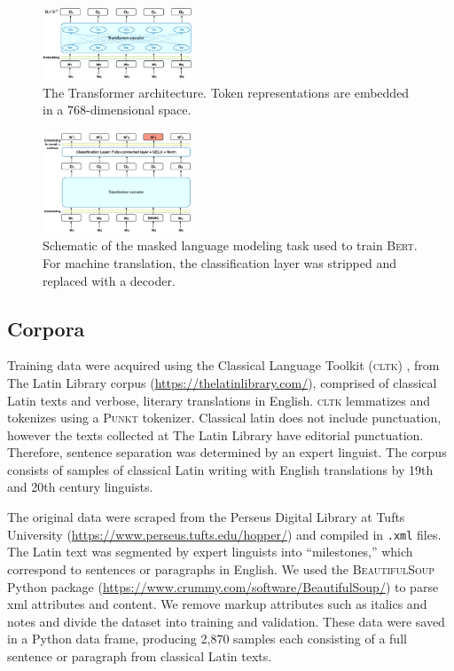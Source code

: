 \documentclass[11pt,a4paper]{article}
\begin{document}
\begin{figure}
    \centering
    \includegraphics[width=0.4\textwidth]{transformer.png}
    \caption{The Transformer architecture.
    Token representations are embedded in a 768-dimensional space.}
    \label{fig:transformer}
\end{figure}

\begin{figure}
    \centering
    \includegraphics[width=0.4\textwidth]{MLM.png}
    \caption{Schematic of the masked language modeling task
    used to train \textsc{Bert}.
    For machine translation, the classification layer was stripped
    and replaced with a decoder.}
    \label{fig:MLM}
\end{figure}

\subsection{Corpora}

Training data were acquired using the Classical Language Toolkit (\textsc{cltk}) \citep{johnson2014}, from The Latin Library corpus (\href{https://thelatinlibrary.com/}{https://thelatinlibrary.com/}),
comprised of classical Latin texts and verbose, literary translations in English.
\textsc{cltk} lemmatizes and tokenizes using a \textsc{Punkt} tokenizer.
Classical latin does not include punctuation,
however the texts collected at The Latin Library have editorial punctuation.
Therefore, sentence separation was determined by an expert linguist.
The corpus consists of samples of classical Latin writing
with English translations by 19th and 20th century linguists.

The original data were scraped from the Perseus Digital Library at Tufts University
(\href{https://www.perseus.tufts.edu/hopper/}{https://www.perseus.tufts.edu/hopper/})
and compiled in \texttt{.xml} files.
The Latin text was segmented by expert linguists into ``milestones,''
which correspond to sentences or paragraphs in English.
We used the \textsc{BeautifulSoup} Python package
(\href{https://www.crummy.com/software/BeautifulSoup/}{https://www.crummy.com/software/BeautifulSoup/})
to parse xml attributes and content.
We remove markup attributes such as italics and notes
and divide the dataset into training and validation.
These data were saved in a Python data frame,
producing 2,870 samples each consisting of a full sentence or paragraph
from classical Latin texts.
\end{document}
